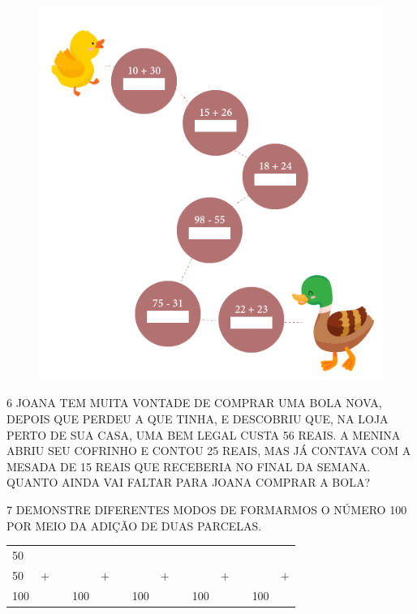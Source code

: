 \begin{figure}[H]
\centering
\includegraphics[width=.7\textwidth]{./media/SAEB_1ANO_MAT_FIGURA23.png}
\end{figure}


\num{6} JOANA TEM MUITA VONTADE DE COMPRAR UMA BOLA NOVA, DEPOIS QUE PERDEU A 
QUE TINHA, E DESCOBRIU QUE, NA LOJA PERTO DE SUA CASA, UMA BEM LEGAL CUSTA 56 
REAIS. A MENINA ABRIU SEU COFRINHO E CONTOU 25 REAIS, MAS JÁ CONTAVA COM A 
MESADA DE 15 REAIS QUE RECEBERIA NO FINAL DA SEMANA. QUANTO AINDA VAI FALTAR 
PARA JOANA COMPRAR A BOLA?


\vspace{3cm}

\num{7} DEMONSTRE DIFERENTES MODOS DE FORMARMOS O NÚMERO 100 POR MEIO DA ADIÇÃO DE
DUAS PARCELAS.

\vspace{2cm}

\begin{center}
\begin{tabular}{llllllllllllll}
50 &  &  & \mbox{} &  &  & \mbox{} &  &  & \mbox{} &  &  & \mbox{} &  \\
50 & $+$ &  & \mbox{} & $+$ &  & \mbox{} & $+$ &  & \mbox{} & $+$ &  & \mbox{} & $+$ \\ \cline{1-1} \cline{4-4} \cline{7-7} \cline{10-10} \cline{13-13}
100 &  &  & 100 &  &  & 100 &  &  & 100 &  &  & 100 & 
\end{tabular}
\end{center}

